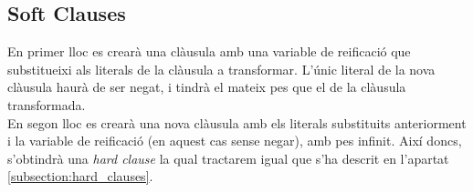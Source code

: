 \documentclass[../informe.tex]{subfiles}
\begin{document}

\subsection{Soft Clauses}
En primer lloc es crearà una clàusula amb una variable de reificació que substitueixi als literals de la clàusula a transformar. L'únic literal de la nova clàusula haurà de ser negat, i tindrà el mateix pes que el de la clàusula transformada.\\

En segon lloc es crearà una nova clàusula amb els literals substituits anteriorment i la variable de reificació (en aquest cas sense negar), amb pes infinit. Així doncs, s'obtindrà una \textit{hard clause} la qual tractarem igual que s'ha descrit en l'apartat \ref{subsection:hard_clauses}.
\end{document}
